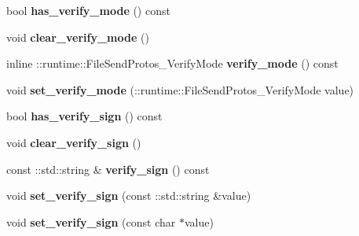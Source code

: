 \begin{DoxyCompactItemize}
\item 
\mbox{\label{classruntime_1_1FileSendProtos_acf9bc19bc21c9b5a4010090cd3025be0}} 
bool {\bfseries has\+\_\+verify\+\_\+mode} () const
\item 
\mbox{\label{classruntime_1_1FileSendProtos_a45d4389af6192915e9e643138ef8f092}} 
void {\bfseries clear\+\_\+verify\+\_\+mode} ()
\item 
\mbox{\label{classruntime_1_1FileSendProtos_a23de1a3929b13fb73da11fc88a3fbfec}} 
inline \+::runtime\+::\+File\+Send\+Protos\+\_\+\+Verify\+Mode {\bfseries verify\+\_\+mode} () const
\item 
\mbox{\label{classruntime_1_1FileSendProtos_a73625f2c2a6ea94431428aff694d0109}} 
void {\bfseries set\+\_\+verify\+\_\+mode} (\+::runtime\+::\+File\+Send\+Protos\+\_\+\+Verify\+Mode value)
\item 
\mbox{\label{classruntime_1_1FileSendProtos_a09e87a4d1f8b4553a9c836e0b6689fd6}} 
bool {\bfseries has\+\_\+verify\+\_\+sign} () const
\item 
\mbox{\label{classruntime_1_1FileSendProtos_afe647962bc42939ebf1a119ff3a69d17}} 
void {\bfseries clear\+\_\+verify\+\_\+sign} ()
\item 
\mbox{\label{classruntime_1_1FileSendProtos_a9dc1f20feb537958b0b40d2d0dc3b348}} 
const \+::std\+::string \& {\bfseries verify\+\_\+sign} () const
\item 
\mbox{\label{classruntime_1_1FileSendProtos_a2cdc2c3681faff4466e6c94e495eabee}} 
void {\bfseries set\+\_\+verify\+\_\+sign} (const \+::std\+::string \&value)
\item 
\mbox{\label{classruntime_1_1FileSendProtos_a2abc9bdb120d872044c6326233cc4fda}} 
void {\bfseries set\+\_\+verify\+\_\+sign} (const char $\ast$value)
\item 
\mbox{\label{classruntime_1_1FileSendProtos_a03d72f6f4010d41a452750d197dd44f6}} 

\end{DoxyCompactItemize}
